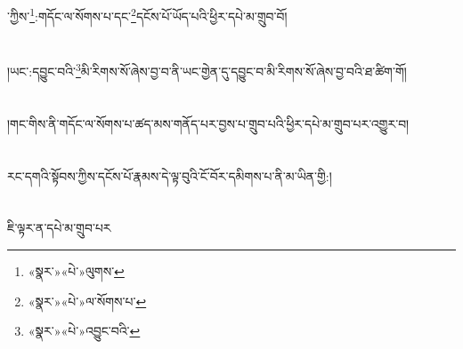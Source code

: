 ་ཀྱིས་\footnote{«སྣར་»«པེ་»ལུགས་}:གདོང་ལ་སོགས་པ་དང་\footnote{«སྣར་»«པེ་»ལ་སོགས་པ་}དངོས་པོ་ཡོད་པའི་ཕྱིར་དཔེ་མ་གྲུབ་བོ།\chapter{ }།ཡང་:དབྱུང་བའི་\footnote{«སྣར་»«པེ་»འབྱུང་བའི་}མི་རིགས་སོ་ཞེས་བྱ་བ་ནི་ཡང་གྱེན་དུ་དབྱུང་བ་མི་རིགས་སོ་ཞེས་བྱ་བའི་ཐ་ཚིག་གོ།\chapter{ }།གང་གིས་ནི་གདོང་ལ་སོགས་པ་ཚད་མས་གནོད་པར་བྱས་པ་གྲུབ་པའི་ཕྱིར་དཔེ་མ་གྲུབ་པར་འགྱུར་བ།\chapter{ }རང་དགའི་སྟོབས་ཀྱིས་དངོས་པོ་རྣམས་དེ་ལྟ་བུའི་ངོ་བོར་དམིགས་པ་ནི་མ་ཡིན་གྱི:།\chapter{ }ཇི་ལྟར་ན་དཔེ་མ་གྲུབ་པར
